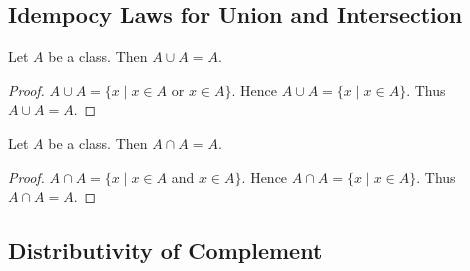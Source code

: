 \documentclass[10pt]{article}
\begin{document}
  \subsection*{Idempocy Laws for Union and Intersection}

  \begin{forthel}
    \begin{proposition}[id=FOUNDATIONS_02_2096996737351680,printid]
      Let $A$ be a class.
      Then $A \cup A = A$.
    \end{proposition}
    \begin{proof}
      $A \cup A = \{x \mid x \in A$ or $x \in A \}$.
      Hence $A \cup A = \{ x \mid x \in A \}$.
      Thus $A \cup A = A$.
    \end{proof}
  \end{forthel}

  \begin{forthel}
    \begin{proposition}[id=FOUNDATIONS_02_4053144145231872,printid]
      Let $A$ be a class.
      Then $A \cap A = A$.
    \end{proposition}
    \begin{proof}
      $A \cap A = \{ x \mid x \in A$ and $x \in A \}$.
      Hence $A \cap A = \{ x \mid x \in A \}$.
      Thus $A \cap A = A$.
    \end{proof}
  \end{forthel}


  \subsection*{Distributivity of Complement}
\end{document}

